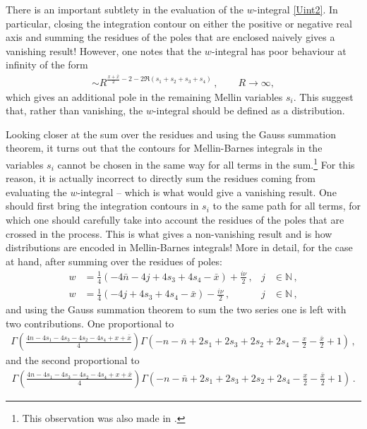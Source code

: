 \documentclass[11pt,a4paper]{article}
\begin{document}
There is an important subtlety in the evaluation of the $w$-integral \eqref{Uint2}. In particular, closing the integration contour on either the positive or negative real axis and summing the residues of the poles that are enclosed naively gives a vanishing result! However, one notes that the $w$-integral has poor behaviour at infinity of the form
\begin{align}
    \sim R^{\tfrac{x+\bar{x}}{2}-2-2\Re\left(s_1+s_2+s_3+s_4\right)}\,, \qquad R \to \infty,
\end{align}
which gives an additional pole in the remaining Mellin variables $s_i$. This suggest that, rather than vanishing, the $w$-integral should be defined as a distribution.

Looking closer at the sum over the residues and using the Gauss summation theorem, it turns out that the contours for Mellin-Barnes integrals in the variables $s_i$ cannot be chosen in the same way for all terms in the sum.\footnote{This observation was also made in \cite{Sleight:2019hfp}.} For this reason, it is actually incorrect to directly sum the residues coming from evaluating the $w$-integral -- which is what would give a vanishing result. One should first bring the integration contours in $s_i$ to the same path for all terms, for which one should carefully take into account the residues of the poles that are crossed in the process. This is what gives a non-vanishing result and is how distributions are encoded in Mellin-Barnes integrals! More in detail, for the case at hand, after summing over the residues of poles:
\begin{subequations}
\begin{align}
    w&= \frac{1}{4} (-4 \bar{n}-4 j+4 s_3+4 s_4-\bar{x})+\frac{i \nu }{2}\,,& j&\in\mathbb{N}\,,\\
    w&= \frac{1}{4} (-4 j+4 s_3+4 s_4-\bar{x})-\frac{i \nu }{2}\,,& j&\in\mathbb{N}\,,
\end{align}
\end{subequations}
and using the Gauss summation theorem to sum the two series one is left with two contributions. One proportional to
\begin{align}
    \Gamma \left(\tfrac{4 n-4 s_1-4 s_3-4 s_2-4 s_4+x+\bar{x}}{4}\right) \Gamma \left(-n-\bar{n}+2 s_1+2 s_3+2 s_2+2 s_4-\tfrac{x}{2}-\tfrac{\bar{x}}{2}+1\right)\,,
\end{align}
and the second proportional to
\begin{align}
    \Gamma \left(\tfrac{4 n-4 s_1-4 s_3-4 s_2-4 s_4+x+\bar{x}}{4}\right) \Gamma \left(-n-\bar{n}+2 s_1+2 s_3+2 s_2+2 s_4-\tfrac{x}{2}-\tfrac{\bar{x}}{2}+1\right)\,.
\end{align}
\end{document}
